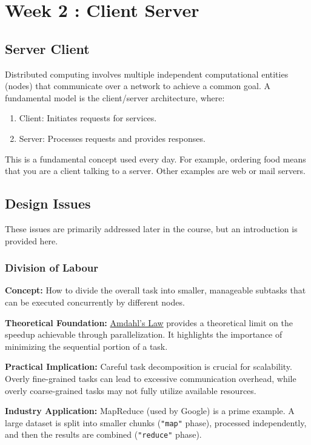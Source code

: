 \section{Week 2 : Client Server}

\subsection{Server Client}
Distributed computing involves multiple independent computational entities (nodes) that communicate over a network to achieve a common goal.  A fundamental model is the client/server architecture, where:
\begin{enumerate}[noitemsep]
    \item Client: Initiates requests for services.
    \item Server: Processes requests and provides responses.
\end{enumerate}

This is a fundamental concept used every day. For example, ordering food means that you are a client talking to a server. Other examples are web or mail servers.

\subsection{Design Issues}
These issues are primarily addressed later in the course, but an introduction is provided here.

\subsubsection{Division of Labour}
\textbf{Concept:} How to divide the overall task into smaller, manageable subtasks that can be executed concurrently by different nodes.

\textbf{Theoretical Foundation:}  \href{https://en.wikipedia.org/wiki/Amdahl\%27s_law}{Amdahl's Law} provides a theoretical limit on the speedup achievable through parallelization. It highlights the importance of minimizing the sequential portion of a task.

\textbf{Practical Implication:} Careful task decomposition is crucial for scalability.  Overly fine-grained tasks can lead to excessive communication overhead, while overly coarse-grained tasks may not fully utilize available resources.

\textbf{Industry Application:}  MapReduce (used by Google) is a prime example.  A large dataset is split into smaller chunks (\texttt{"map"} phase), processed independently, and then the results are combined (\texttt{"reduce"} phase).


